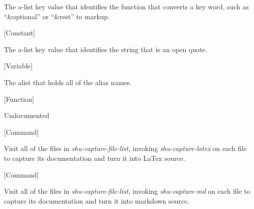 \begin{doc-string}
The a-list key value that identifies the function that converts a key word, such
as ``\&optional'' or ``\&rest'' to markup.
\end{doc-string}

\vspace{1em}
\noindent
{}
\usebox{\funcname}
 \hfill [Constant]

\begin{doc-string}
The a-list key value that identifies the string that is an open quote.
\end{doc-string}

\vspace{1em}
\noindent
{}
\usebox{\funcname}
 \hfill [Variable]

\begin{doc-string}
The alist that holds all of the alias names.
\end{doc-string}

\vspace{1em}
\noindent
{}
\usebox{\funcname}
 \hfill [Function]

\begin{doc-string}
Undocumented
\end{doc-string}

\vspace{1em}
\noindent
{}
\usebox{\funcname}
 \hfill [Command]

\begin{doc-string}
Visit all of the files in \emph{shu-capture-file-list}, invoking \emph{shu-capture-latex} on
each file to capture its documentation and turn it into LaTex source.
\end{doc-string}

\vspace{1em}
\noindent
{}
\usebox{\funcname}
 \hfill [Command]

\begin{doc-string}
Visit all of the files in \emph{shu-capture-file-list}, invoking \emph{shu-capture-md} on each
file to capture its documentation and turn it into markdown source.
\end{doc-string}

